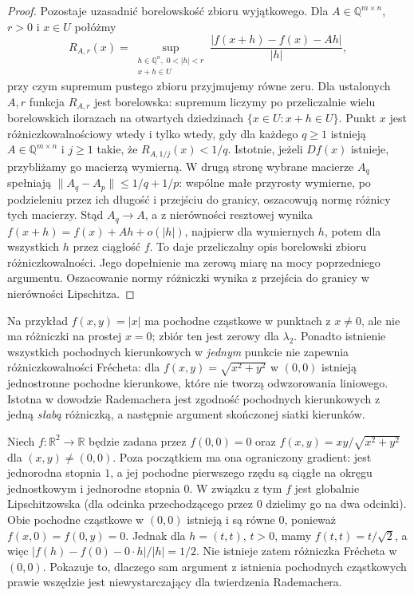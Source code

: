\begin{proof}
Pozostaje uzasadnić borelowskość zbioru wyjątkowego.
Dla $A\in\mathbb Q^{m\times n}$, $r>0$ i $x\in U$
połóżmy
\[
 R_{A,r}(x)=\sup_{\substack{h\in\mathbb Q^n,\;0<|h|<r\\
                                    x+h\in U}}
 \frac{|f(x+h)-f(x)-Ah|}{|h|},
\]
przy czym supremum pustego zbioru przyjmujemy równe
zeru. Dla ustalonych $A,r$ funkcja $R_{A,r}$ jest
borelowska: supremum liczymy po przeliczalnie wielu
borelowskich ilorazach na otwartych dziedzinach
$\{x\in U:x+h\in U\}$.
Punkt $x$ jest różniczkowalnościowy wtedy i tylko wtedy,
gdy dla każdego $q\ge1$ istnieją
$A\in\mathbb Q^{m\times n}$ i $j\ge1$ takie, że
$R_{A,1/j}(x)<1/q$. Istotnie, jeżeli $Df(x)$ istnieje,
przybliżamy go macierzą wymierną. W drugą stronę
wybrane macierze $A_q$ spełniają
$\|A_q-A_p\|\le1/q+1/p$:
wspólne małe przyrosty wymierne, po podzieleniu przez
ich długość i przejściu do granicy, oszacowują normę
różnicy tych macierzy. Stąd $A_q\to A$, a z nierówności
resztowej wynika $f(x+h)=f(x)+Ah+o(|h|)$, najpierw
dla wymiernych $h$, potem dla wszystkich $h$ przez
ciągłość $f$. To daje przeliczalny opis borelowski
zbioru różniczkowalności. Jego dopełnienie ma zerową
miarę na mocy poprzedniego argumentu.
Oszacowanie normy różniczki wynika z przejścia do
granicy w nierówności Lipschitza.
\end{proof}

\begin{uwaga}
Na przykład $f(x,y)=|x|$ ma pochodne cząstkowe
w punktach z $x\ne0$, ale nie ma różniczki na prostej
$x=0$; zbiór ten jest zerowy dla $\lambda_2$.
Ponadto istnienie wszystkich pochodnych kierunkowych
w \emph{jednym} punkcie nie zapewnia różniczkowalności
Frécheta: dla $f(x,y)=\sqrt{x^2+y^2}$ w $(0,0)$
istnieją jednostronne pochodne kierunkowe, które nie
tworzą odwzorowania liniowego. Istotna w dowodzie
Rademachera jest zgodność pochodnych kierunkowych
z jedną \emph{słabą} różniczką, a następnie
argument skończonej siatki kierunków.
\end{uwaga}

\begin{przyklad}
Niech $f:\mathbb R^2\to\mathbb R$ będzie zadana przez
$f(0,0)=0$ oraz $f(x,y)=xy/\sqrt{x^2+y^2}$
dla $(x,y)\ne(0,0)$. Poza początkiem ma ona
ograniczony gradient: jest jednorodna stopnia $1$,
a jej pochodne pierwszego rzędu są ciągłe na
okręgu jednostkowym i jednorodne stopnia $0$.
W związku z tym $f$ jest globalnie Lipschitzowska
(dla odcinka przechodzącego przez $0$ dzielimy go
na dwa odcinki). Obie pochodne cząstkowe w $(0,0)$
istnieją i są równe $0$, ponieważ $f(x,0)=f(0,y)=0$.
Jednak dla $h=(t,t)$, $t>0$, mamy
$f(t,t)=t/\sqrt2$, a więc
$|f(h)-f(0)-0\cdot h|/|h|=1/2$.
Nie istnieje zatem różniczka Frécheta w $(0,0)$.
Pokazuje to, dlaczego sam argument z istnienia
pochodnych cząstkowych prawie wszędzie jest
niewystarczający dla twierdzenia Rademachera.
\end{przyklad}

